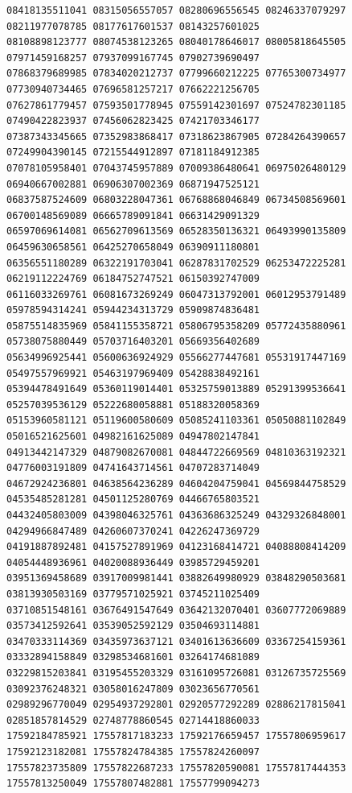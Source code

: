 \documentclass[10pt]{article}
\begin{document}
\begin{verbatim}
08418135511041 08315056557057 08280696556545 08246337079297 08211977078785 08177617601537 08143257601025
08108898123777 08074538123265 08040178646017 08005818645505 07971459168257 07937099167745 07902739690497
07868379689985 07834020212737 07799660212225 07765300734977 07730940734465 07696581257217 07662221256705
07627861779457 07593501778945 07559142301697 07524782301185 07490422823937 07456062823425 07421703346177
07387343345665 07352983868417 07318623867905 07284264390657 07249904390145 07215544912897 07181184912385
07078105958401 07043745957889 07009386480641 06975026480129 06940667002881 06906307002369 06871947525121
06837587524609 06803228047361 06768868046849 06734508569601 06700148569089 06665789091841 06631429091329
06597069614081 06562709613569 06528350136321 06493990135809 06459630658561 06425270658049 06390911180801
06356551180289 06322191703041 06287831702529 06253472225281 06219112224769 06184752747521 06150392747009
06116033269761 06081673269249 06047313792001 06012953791489 05978594314241 05944234313729 05909874836481
05875514835969 05841155358721 05806795358209 05772435880961 05738075880449 05703716403201 05669356402689
05634996925441 05600636924929 05566277447681 05531917447169 05497557969921 05463197969409 05428838492161
05394478491649 05360119014401 05325759013889 05291399536641 05257039536129 05222680058881 05188320058369
05153960581121 05119600580609 05085241103361 05050881102849 05016521625601 04982161625089 04947802147841
04913442147329 04879082670081 04844722669569 04810363192321 04776003191809 04741643714561 04707283714049
04672924236801 04638564236289 04604204759041 04569844758529 04535485281281 04501125280769 04466765803521
04432405803009 04398046325761 04363686325249 04329326848001 04294966847489 04260607370241 04226247369729
04191887892481 04157527891969 04123168414721 04088808414209 04054448936961 04020088936449 03985729459201
03951369458689 03917009981441 03882649980929 03848290503681 03813930503169 03779571025921 03745211025409
03710851548161 03676491547649 03642132070401 03607772069889 03573412592641 03539052592129 03504693114881
03470333114369 03435973637121 03401613636609 03367254159361 03332894158849 03298534681601 03264174681089
03229815203841 03195455203329 03161095726081 03126735725569 03092376248321 03058016247809 03023656770561
02989296770049 02954937292801 02920577292289 02886217815041 02851857814529 02748778860545 02714418860033
17592184785921 17557817183233 17592176659457 17557806959617 17592123182081 17557824784385 17557824260097
17557823735809 17557822687233 17557820590081 17557817444353 17557813250049 17557807482881 17557799094273

\end{verbatim}
\end{document}
